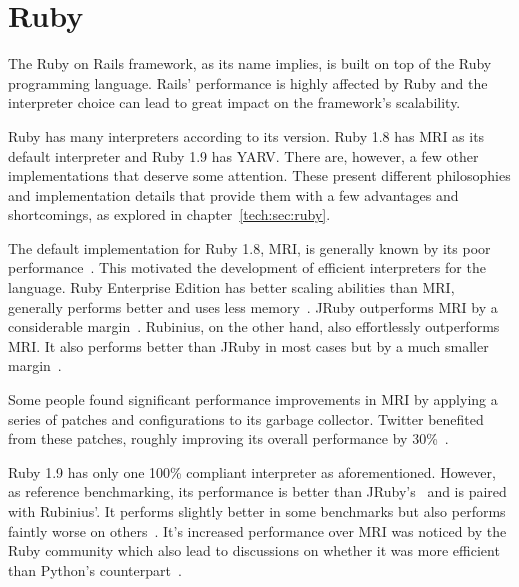 \section{Ruby} %
\label{state:sec:ruby}
The Ruby on Rails framework, as its name implies, is built on top of the Ruby programming language. Rails' performance is highly affected by Ruby and the interpreter choice can lead to great impact on the framework's scalability.

Ruby has many interpreters according to its version. Ruby 1.8 has MRI as its default interpreter and Ruby 1.9 has YARV. There are, however, a few other implementations that deserve some attention. These present different philosophies and implementation details that provide them with a few advantages and shortcomings, as explored in chapter~\ref{tech:sec:ruby}.

The default implementation for Ruby 1.8, MRI, is generally known by its poor performance~\cite{6tips_for_mri}. This motivated the development of efficient interpreters for the language. Ruby Enterprise Edition has better scaling abilities than MRI, generally performs better and uses less memory~\cite{ree_benchmarks}. JRuby outperforms MRI by a considerable margin~\cite{ruby19_performance}. Rubinius, on the other hand, also effortlessly outperforms MRI. It also performs better than JRuby in most cases but by a much smaller margin~\cite{rvm_rubinius_benchmarks}.

Some people found significant performance improvements in MRI by applying a series of patches and configurations to its garbage collector. Twitter benefited from these patches, roughly improving its overall performance by 30\%~\cite{ruby_gc_tuning}.

Ruby 1.9 has only one 100\% compliant interpreter as aforementioned. However, as reference benchmarking, its performance is better than JRuby's~\cite{ruby19_performance} and is paired with Rubinius'. It performs slightly better in some benchmarks but also performs faintly worse on others~\cite{rvm_rubinius_benchmarks,ruby_interpreter_benchmarks}. It's increased performance over MRI was noticed by the Ruby community which also lead to discussions on whether it was more efficient than Python's counterpart~\cite{ruby19_python}.

